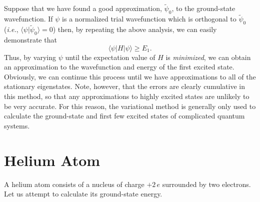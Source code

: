 Suppose that we have found a good approximation, $\tilde{\psi}_0$, to the ground-state
wavefunction. If $\psi$ is a normalized trial wavefunction which is 
orthogonal to $\tilde{\psi}_0$ ({\em i.e.}, $\langle \psi|\tilde{\psi}_0\rangle=0$)
then, by repeating the above analysis, we can easily demonstrate that
\begin{equation}
\langle \psi |H|\psi\rangle \geq E_1.
\end{equation}
Thus, by varying $\psi$ until the expectation value of $H$ is {\em minimized}, we can
obtain  an approximation to the wavefunction and energy of the first excited state. Obviously, we can continue this process until we have approximations
to all of the stationary eigenstates. Note, however, that  the errors are clearly cumulative in this method, 
so that any approximations to  highly excited states are unlikely to be very accurate. For this reason, the variational method is generally only
used to calculate the ground-state and first few excited states of
complicated quantum systems.

\section{Helium Atom}
A helium atom consists of a nucleus of charge $+2\,e$ surrounded
by two electrons. Let us attempt to calculate its ground-state energy.

